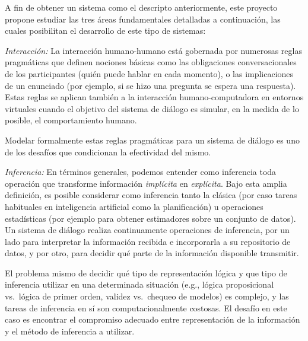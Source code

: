 A fin de obtener un sistema como el descripto anteriormente, este proyecto propone estudiar las tres \'areas fundamentales detalladas a continuaci\'on, las cuales posibilitan el desarrollo de este tipo de sistemas:
\begin{myitemize}
  \item \emph{Interacci\'on:} La interacci\'on humano-humano est\'a gobernada
  por numerosas reglas pragm\'aticas que definen nociones b\'asicas como
  las obligaciones conversacionales de los participantes (qui\'en puede hablar en cada momento), o las implicaciones de un enunciado (por ejemplo, si se
  hizo una pregunta se espera una respuesta).
  Estas reglas se aplican tambi\'en a la interacci\'on humano-computadora en
  entornos virtuales cuando el objetivo del sistema de di\'alogo es
  simular, en la medida de lo posible, el comportamiento humano.

  Modelar formalmente estas reglas pragm\'aticas para un sistema de di\'alogo es uno de los desaf\'ios que condicionan la efectividad del mismo.

  \item \emph{Inferencia:} En t\'erminos generales, podemos entender como
  inferencia toda operaci\'on que transforme informaci\'on \textit{impl\'icita} en
  \textit{expl\'icita}.  Bajo esta amplia definici\'on, es posible considerar como
  inferencia tanto la cl\'asica (por caso
  tareas habituales en inteligencia artificial como la planificaci\'on) u operaciones estad\'isticas (por ejemplo para obtener estimadores sobre un conjunto de datos).  Un sistema de di\'alogo realiza continuamente operaciones de inferencia, por un lado   para interpretar la informaci\'on recibida e incorporarla a su repositorio de datos, y por otro, para decidir qu\'e parte de la informaci\'on disponible transmitir.

  El problema mismo de decidir qu\'e tipo de representaci\'on l\'ogica y que tipo de inferencia utilizar en una determinada situaci\'on (e.g., l\'ogica proposicional vs.\ l\'ogica de primer orden, validez vs.\ chequeo de modelos) es complejo, y las tareas de inferencia en s\'i son computacionalmente costosas.  El desaf\'io en este caso es encontrar el compromiso adecuado entre representaci\'on de la informaci\'on y el m\'etodo de inferencia a utilizar.


\end{myitemize}
